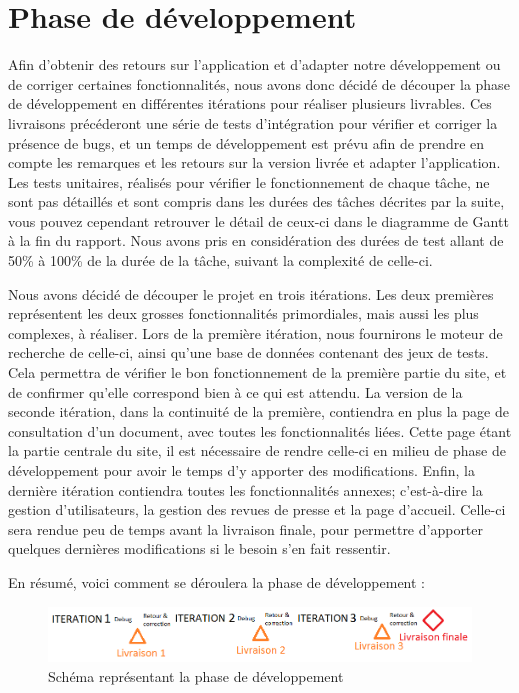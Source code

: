 \section{Phase de développement}
\label{sec:dev}

	Afin d'obtenir des retours sur l'application et d'adapter notre développement ou de corriger certaines fonctionnalités, nous avons donc décidé de découper la phase de développement en différentes itérations pour réaliser plusieurs livrables. Ces livraisons précéderont une série de tests d'intégration pour vérifier et corriger la présence de bugs, et un temps de développement est prévu afin de prendre en compte les remarques et les retours sur la version livrée et adapter l'application. Les tests unitaires, réalisés pour vérifier le fonctionnement de chaque tâche, ne sont pas détaillés et sont compris dans les durées des tâches décrites par la suite, vous pouvez cependant retrouver le détail de ceux-ci dans le diagramme de Gantt à la fin du rapport. Nous avons pris en considération des durées de test allant de 50\% à 100\% de la durée de la tâche, suivant la complexité de celle-ci.

	Nous avons décidé de découper le projet en trois itérations. Les deux premières représentent les deux grosses fonctionnalités primordiales, mais aussi les plus complexes, à réaliser. Lors de la première itération, nous fournirons le moteur de recherche de celle-ci, ainsi qu'une base de données contenant des jeux de tests. Cela permettra de vérifier le bon fonctionnement de la première partie du site, et de confirmer qu'elle correspond bien à ce qui est attendu. La version de la seconde itération, dans la continuité de la première, contiendra en plus la page de consultation d'un document, avec toutes les fonctionnalités liées. Cette page étant la partie centrale du site, il est nécessaire de rendre celle-ci en milieu de phase de développement pour avoir le temps d'y apporter des modifications. Enfin, la dernière itération contiendra toutes les fonctionnalités annexes; c'est-à-dire la gestion d'utilisateurs, la gestion des revues de presse et la page d'accueil. Celle-ci sera rendue peu de temps avant la livraison finale, pour permettre d'apporter quelques dernières modifications si le besoin s'en fait ressentir.

	En résumé, voici comment se déroulera la phase de développement :

	\begin{figure}[H]
        \centering
        \includegraphics[width=\textwidth]{figure/schema_developpement.png}
            \caption{Schéma représentant la phase de développement}
            \label{fig:sch_dev}
    \end{figure}